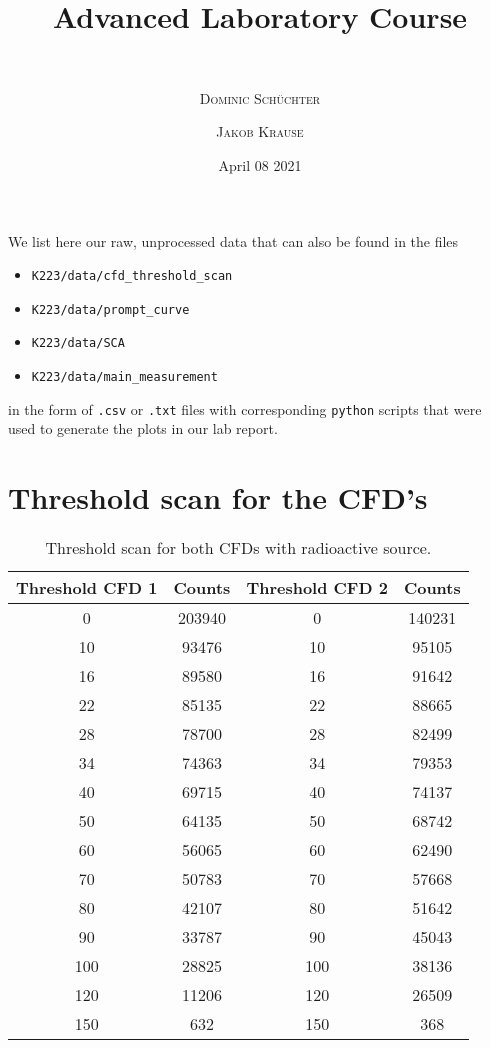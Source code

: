 \documentclass[11pt,a4paper,notitlepage]{scrartcl}
\title{ Advanced Laboratory Course}
\subtitle{\name  \\ \hrulefill}
\date{April 08 2021 \\ \hrulefill}
\author[*]{\textsc{Dominic Schüchter}}
\author[$\dagger$]{\textsc{Jakob Krause}}
\affil[*]{\href{mailto:dschuechter@uni-bonn.de}{\faEnvelope  \hspace*{0.1cm}dschuechter@uni-bonn.de} {\color{black}$|$} \href{https://github.com/dschuechter}{\faGithub  \hspace*{0.1cm}dschuechter}}
\affil[$\dagger$]{\href{mailto:krause.jakob@uni-bonn.de}{\faEnvelope  \hspace*{0.1cm}krause.jakob@uni-bonn.de} {\color{black}$|$} \href{https://github.com/krausejm}{\faGithub  \hspace*{0.1cm}krausejm}}
\begin{document}
	\maketitle
	We list here our raw, unprocessed data that can also be found in the files \begin{itemize}
		\item \texttt{K223/data/cfd\_threshold\_scan}
		\item \texttt{K223/data/prompt\_curve}
		\item \texttt{K223/data/SCA}
		\item \texttt{K223/data/main\_measurement} 
	\end{itemize}  in the form of \texttt{.csv} or \texttt{.txt} files with corresponding \texttt{python} scripts that were used to generate the plots in our lab report. 
\newpage
\section*{Threshold scan for the CFD's}

\begin{table}[htbp]
	\centering
	\begin{tabular}{cccc}
		\toprule
			Threshold CFD 1 & Counts  & Threshold CFD 2 & Counts \\
		\hline
		0           & 203940       & 0           & 140231       \\
		10          & 93476        & 10          & 95105        \\
		16          & 89580        & 16          & 91642        \\
		22          & 85135        & 22          & 88665        \\
		28          & 78700        & 28          & 82499        \\
		34          & 74363        & 34          & 79353        \\
		40          & 69715        & 40          & 74137        \\
		50          & 64135        & 50          & 68742        \\
		60          & 56065        & 60          & 62490        \\
		70          & 50783        & 70          & 57668        \\
		80          & 42107        & 80          & 51642        \\
		90          & 33787        & 90          & 45043        \\
		100         & 28825        & 100         & 38136        \\
		120         & 11206        & 120         & 26509        \\
		150         & 632          & 150         & 368          \\
	\bottomrule
	\end{tabular}
\caption{Threshold scan for both CFDs with radioactive source.}
\end{table}
\end{document}
